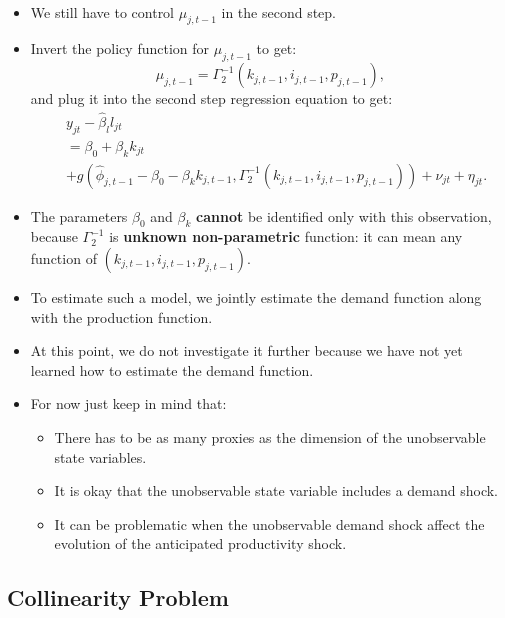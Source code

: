\documentclass[
]{book}
\providecommand{\tightlist}{%
  \setlength{\itemsep}{0pt}\setlength{\parskip}{0pt}}
\begin{document}
\begin{itemize}
\begin{equation}
\begin{split}
  \end{split}
  \end{equation}
\item
  We still have to control \(\mu_{j, t - 1}\) in the second step.
\item
  Invert the policy function for \(\mu_{j, t - 1}\) to get:
  \begin{equation}
  \mu_{j, t - 1} = \Gamma_2^{- 1}(k_{j, t - 1}, i_{j, t - 1}, p_{j, t - 1}),
  \end{equation}
  and plug it into the second step regression equation to get:
  \begin{equation}
  \begin{split}
  &y_{jt} - \hat{\beta}_l l_{jt}\\
  &= \beta_0 + \beta_k k_{jt}\\
  &+g(\hat{\phi}_{j, t - 1} - \beta_0 - \beta_k k_{j, t - 1}, \Gamma_2^{- 1}(k_{j, t - 1}, i_{j, t - 1}, p_{j, t - 1})) + \nu_{jt} + \eta_{jt}.
  \end{split}
  \end{equation}
\item
  The parameters \(\beta_0\) and \(\beta_k\) \textbf{cannot} be identified only with this observation, because \(\Gamma_2^{-1}\) is \textbf{unknown non-parametric} function: it can mean any function of \((k_{j, t - 1}, i_{j, t - 1}, p_{j, t - 1})\).
\item
  To estimate such a model, we jointly estimate the demand function along with the production function.
\item
  At this point, we do not investigate it further because we have not yet learned how to estimate the demand function.
\item
  For now just keep in mind that:

  \begin{itemize}
  \tightlist
  \item
    There has to be as many proxies as the dimension of the unobservable state variables.
  \item
    It is okay that the unobservable state variable includes a demand shock.
  \item
    It can be problematic when the unobservable demand shock affect the evolution of the anticipated productivity shock.
  \end{itemize}
\end{itemize}

\hypertarget{collinearity-problem}{%
\subsection{Collinearity Problem}\label{collinearity-problem}}
\end{document}
